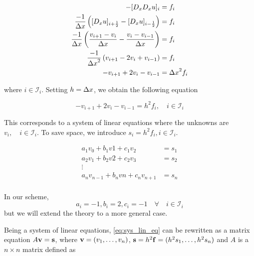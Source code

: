 \documentclass[a4paper]{article}
\begin{document}
\begin{align*}
-[D_x D_x u]_i &= f_i \\
\frac{-1}{{\Delta x}} \left( [D_x u]_{i+\frac{1}{2}} - [D_x u]_{i-\frac{1}{2}} \right) &= f_i \\
\frac{-1}{{\Delta x}} \left( \frac{v_{i+1} - v_{i}}{{\Delta x}} - \frac{v_{i} - v_{i-1}}{{\Delta x}} \right) &= f_i \\
\frac{-1}{{\Delta x}^2} \left( v_{i+1} - 2v_{i} + v_{i-1} \right) &= f_i \\
-v_{i+1} + 2v_{i} - v_{i-1}  &= {\Delta x}^2 f_i
\end{align*}

where $i \in \mathcal{I}_i$. Setting $h = {\Delta x}$, we obtain the following equation

\begin{equation}
-v_{i+1} + 2v_{i} - v_{i-1}  = h^2 f_i, \quad i \in \mathcal{I}_i
\label{ddu_dxx_disc}
\end{equation}

This corresponds to a system of linear equations where the unknowns are $v_i, \quad i \in \mathcal{I}_i$. To save space, we introduce $s_i = h^2 f_i, i \in \mathcal{I}_i$.

\begin{equation}\label{eq:sys_lin_eq}
    \begin{array}{cccc}
        a_1 v_{0} + b_1 v{1} + c_1 v_{2} &= s_1 \\
        a_2 v_{1} + b_2 v{2} + c_2 v_{3} &= s_2 \\
        \vdots \\
        a_n v_{n-1} + b_n v{n} + c_n v_{n+1} &= s_n \\
    \end{array}
\end{equation}

In our scheme,
\begin{equation}
a_i = -1, b_i = 2, c_i = -1 \quad \forall \quad i \in \mathcal{I}_i
\label{eq:spec_abc}
\end{equation}
but we will extend the theory to a more general case.

Being a system of linear equations, \eqref{eq:sys_lin_eq} can be rewritten as a matrix equation $A {\bf v} = {\bf s}$, where ${\bf v} = (v_1, \dots, v_{n})$, ${\bf s} = h^2 {\bf f} = (h^2 s_1, \dots, h^2 s_{n})$ and $A$ is a $n \times n$ matrix defined as
\end{document}
